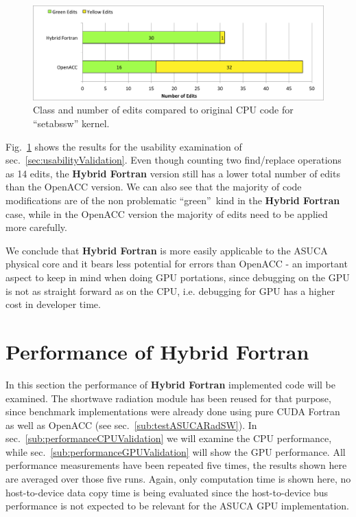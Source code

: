 \begin{figure}[htpb]
        \centering
        \includegraphics[width=14cm]{figures/verificationNumOfEdits}
        \caption[Usability Comparison]{Class and number of edits compared to original CPU code for ``setabssw'' kernel.}
        \label{figure:verificationNumOfEdits}
\end{figure}

Fig.~\ref{figure:verificationNumOfEdits} shows the results for the usability examination of sec.~\ref{sec:usabilityValidation}. Even though counting two find/replace operations as 14 edits, the \textbf{Hybrid Fortran} version still has a lower total number of edits than the OpenACC version. We can also see that the majority of code modifications are of the non problematic \textquotedblleft green\textquotedblright\ kind in the \textbf{Hybrid Fortran} case, while in the OpenACC version the majority of edits need to be applied more carefully.

We conclude that \textbf{Hybrid Fortran} is more easily applicable to the ASUCA physical core and it bears less potential for errors than OpenACC - an important aspect to keep in mind when doing GPU portations, since debugging on the GPU is not as straight forward as on the CPU, i.e. debugging for GPU has a higher cost in developer time.

\clearpage
\section{Performance of Hybrid Fortran} \label{sec:performanceValidation}

In this section the performance of \textbf{Hybrid Fortran} implemented code will be examined. The shortwave radiation module has been reused for that purpose, since benchmark implementations were already done using pure CUDA Fortran as well as OpenACC (see sec.~\ref{sub:testASUCARadSW}). In sec.~\ref{sub:performanceCPUValidation} we will examine the CPU performance, while sec.~\ref{sub:performanceGPUValidation} will show the GPU performance. All performance measurements have been repeated five times, the results shown here are averaged over those five runs. Again, only computation time is shown here, no host-to-device data copy time is being evaluated since the host-to-device bus performance is not expected to be relevant for the ASUCA GPU implementation.

